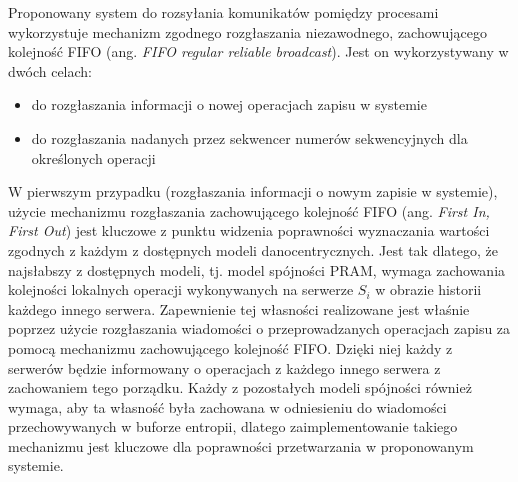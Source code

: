 Proponowany system do rozsyłania komunikatów pomiędzy procesami wykorzystuje mechanizm zgodnego rozgłaszania niezawodnego, zachowującego kolejność FIFO (ang. \textit{FIFO regular reliable broadcast}). Jest on wykorzystywany w dwóch celach:

\begin{itemize}
    \item do rozgłaszania informacji o nowej operacjach zapisu w systemie
    \item do rozgłaszania nadanych przez sekwencer numerów sekwencyjnych dla określonych operacji
\end{itemize}

W pierwszym przypadku (rozgłaszania informacji o nowym zapisie w systemie), użycie mechanizmu rozgłaszania zachowującego kolejność FIFO (ang. \textit{First In, First Out}) jest kluczowe z punktu widzenia poprawności wyznaczania wartości zgodnych z każdym z dostępnych modeli danocentrycznych. Jest tak dlatego, że najsłabszy z dostępnych modeli, tj. model spójności PRAM, wymaga zachowania kolejności lokalnych operacji wykonywanych na serwerze $ S_i $ w obrazie historii każdego innego serwera. Zapewnienie tej własności realizowane jest właśnie poprzez użycie rozgłaszania wiadomości o przeprowadzanych operacjach zapisu za pomocą mechanizmu zachowującego kolejność FIFO. Dzięki niej każdy z serwerów będzie informowany o operacjach z każdego innego serwera z zachowaniem tego porządku. Każdy z pozostałych modeli spójności również wymaga, aby ta własność była zachowana w odniesieniu do wiadomości przechowywanych w buforze entropii, dlatego zaimplementowanie takiego mechanizmu jest kluczowe dla poprawności przetwarzania w proponowanym systemie.


